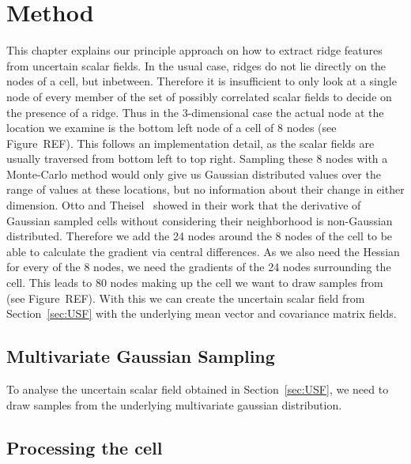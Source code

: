 \chapter{Method}\label{chap:Method}

This chapter explains our principle approach on how to extract ridge
features from uncertain scalar fields. In the usual case, ridges do not
lie directly on the nodes of a cell, but inbetween. Therefore it is
insufficient to only look at a single node of every member of the set of
possibly correlated scalar fields to decide on the presence of a ridge.
Thus in the $3$-dimensional case the actual node at the location we
examine is the bottom left node of a cell of 8 nodes (see Figure~REF).
This follows an implementation detail, as the scalar fields are usually
traversed from bottom left to top right. Sampling these 8 nodes with a
Monte-Carlo method would only give us Gaussian distributed values over
the range of values at these locations, but no information about their
change in either dimension. Otto and Theisel~\cite{Vortex} showed in
their work that the derivative of Gaussian sampled cells without
considering their neighborhood is non-Gaussian distributed. Therefore we
add the 24 nodes around the 8 nodes of the cell to be able to calculate
the gradient via central differences. As we also need the Hessian for
every of the 8 nodes, we need the gradients of the 24 nodes surrounding
the cell. This leads to 80 nodes making up the cell we want to draw
samples from (see Figure~REF). With this we can create the uncertain
scalar field from Section~\ref{sec:USF} with the underlying mean vector
and covariance matrix fields.

\section{Multivariate Gaussian Sampling}\label{sec:MGS}

To analyse the uncertain scalar field obtained in Section~\ref{sec:USF},
we need to draw samples from the underlying multivariate gaussian
distribution.

\section{Processing the cell}\label{sec:proc}
